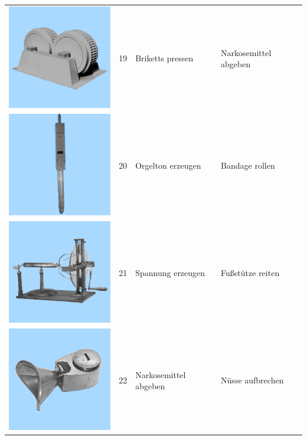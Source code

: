 \documentclass[
  english,
  doc,12pt,twoside,floatsintext]{apa7}
\begin{document}
\begin{center}
\begin{ThreePartTable}
\begin{longtable}{llll}
\includegraphics[valign=c, scale=0.19]{../materials/unfamiliar/19.png} & 19 & Briketts pressen & Narkosemittel abgeben\\
\includegraphics[valign=c, scale=0.19]{../materials/unfamiliar/20.png} & 20 & Orgelton erzeugen & Bandage rollen\\
\includegraphics[valign=c, scale=0.19]{../materials/unfamiliar/21.png} & 21 & Spannung erzeugen & Fußstütze reiten\\
\includegraphics[valign=c, scale=0.19]{../materials/unfamiliar/22.png} & 22 & Narkosemittel abgeben & Nüsse aufbrechen\\

\end{longtable}
\end{ThreePartTable}
\end{center}
\end{document}
